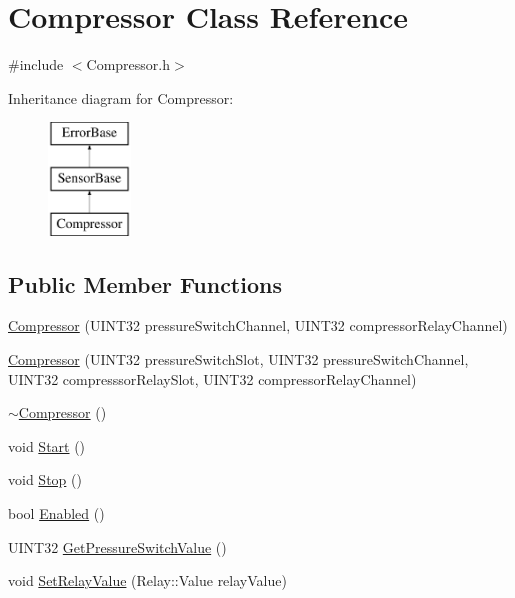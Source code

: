 \hypertarget{classCompressor}{\section{\-Compressor \-Class \-Reference}
\label{classCompressor}
}


{\ttfamily \#include $<$\-Compressor.\-h$>$}

\-Inheritance diagram for \-Compressor\-:\begin{figure}[H]
\begin{center}
\leavevmode
\includegraphics[height=3.000000cm]{classCompressor}
\end{center}
\end{figure}
\subsection*{\-Public \-Member \-Functions}
\begin{DoxyCompactItemize}
\item 
\hyperlink{classCompressor_af1a57848f4a733fe30f555f700d5ce8b}{\-Compressor} (\-U\-I\-N\-T32 pressure\-Switch\-Channel, \-U\-I\-N\-T32 compressor\-Relay\-Channel)
\item 
\hyperlink{classCompressor_afe0043d5d4c885f7c61860373044499e}{\-Compressor} (\-U\-I\-N\-T32 pressure\-Switch\-Slot, \-U\-I\-N\-T32 pressure\-Switch\-Channel, \-U\-I\-N\-T32 compresssor\-Relay\-Slot, \-U\-I\-N\-T32 compressor\-Relay\-Channel)
\item 
\hyperlink{classCompressor_a7153be4a80054c7da7b355ff6841c0f7}{$\sim$\-Compressor} ()
\item 
void \hyperlink{classCompressor_a710bb74699442b508062a109ed24e6a0}{\-Start} ()
\item 
void \hyperlink{classCompressor_a293182b6bfc18782b29deb8d7a99ff40}{\-Stop} ()
\item 
bool \hyperlink{classCompressor_a951cf9c276faa926510bf7b368efdef8}{\-Enabled} ()
\item 
\-U\-I\-N\-T32 \hyperlink{classCompressor_a085220e028ebdd0bca7a3df2c5081478}{\-Get\-Pressure\-Switch\-Value} ()
\item 
void \hyperlink{classCompressor_afc6d48dce81c1c8a3d14c5da4c8cde99}{\-Set\-Relay\-Value} (\-Relay\-::\-Value relay\-Value)
\end{DoxyCompactItemize}


